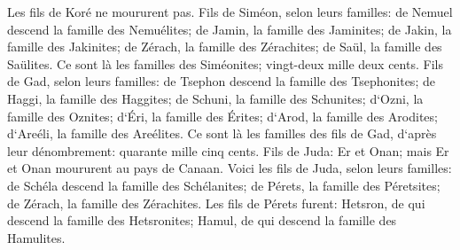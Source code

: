 \verse Les fils de Koré ne moururent pas. 
\verse Fils de Siméon, selon leurs familles: de Nemuel descend la famille des Nemuélites; de Jamin, la famille des Jaminites; de Jakin, la famille des Jakinites; 
\verse de Zérach, la famille des Zérachites; de Saül, la famille des Saülites. 
\verse Ce sont là les familles des Siméonites; vingt-deux mille deux cents. 
\verse Fils de Gad, selon leurs familles: de Tsephon descend la famille des Tsephonites; de Haggi, la famille des Haggites; de Schuni, la famille des Schunites; 
\verse d`Ozni, la famille des Oznites; d`Éri, la famille des Érites; 
\verse d`Arod, la famille des Arodites; d`Areéli, la famille des Areélites. 
\verse Ce sont là les familles des fils de Gad, d`après leur dénombrement: quarante mille cinq cents. 
\verse Fils de Juda: Er et Onan; mais Er et Onan moururent au pays de Canaan. 
\verse Voici les fils de Juda, selon leurs familles: de Schéla descend la famille des Schélanites; de Pérets, la famille des Péretsites; de Zérach, la famille des Zérachites. 
\verse Les fils de Pérets furent: Hetsron, de qui descend la famille des Hetsronites; Hamul, de qui descend la famille des Hamulites. 
